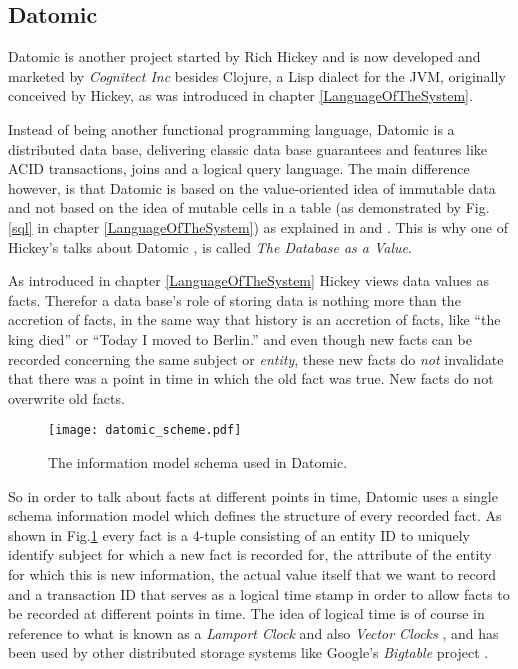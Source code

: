 \subsection{Datomic}
\label{datomic}

Datomic \cite{datomic} is another project started by Rich Hickey and is now
developed and marketed by \textit{Cognitect Inc} besides Clojure, a Lisp
dialect for the JVM, originally conceived by Hickey, as was introduced in
chapter \ref{LanguageOfTheSystem}.

Instead of being another functional programming language, Datomic
is a distributed data base, delivering classic data base guarantees and
features like ACID transactions, joins and a logical query language.
The main difference however, is that Datomic is based on the
value-oriented idea of immutable data and not based on the idea of
mutable cells in a table (as demonstrated by Fig.\ref{sql} in
chapter \ref{LanguageOfTheSystem}) as explained in
\cite{datomic-architecture} and \cite{datomic-datamodel}.
This is why one of Hickey's talks about Datomic \cite{datomic-talk1},
\cite{datomic-talk2} is called \textit{The Database as a Value}.

As introduced in chapter \ref{LanguageOfTheSystem} Hickey views
data values as facts. Therefor a data base's role of storing data
is nothing more than the accretion of facts, in the same way
that history is an accretion of facts, like ``the king died'' or
``Today I moved to Berlin.'' and even though new facts can be
recorded concerning the same subject or \textit{entity}, these
new facts do \textit{not} invalidate that there was a point in time
in which the old fact was true. New facts do not overwrite old facts.

\begin{figure}[h]
  \texttt{[image: datomic\_scheme.pdf]}
  \caption{The information model schema used in Datomic.}
  \label{datomic_schema}
\end{figure}

So in order to talk about facts at different points in time, Datomic
uses a single schema information model which defines the structure
of every recorded fact. As shown in Fig.\ref{datomic_schema} every
fact is a 4-tuple consisting of an entity ID to uniquely identify
subject for which a new fact is recorded for, the attribute of
the entity for which this is new information, the actual value itself
that we want to record and a transaction ID that serves as a logical
time stamp in order to allow facts to be recorded at different points
in time. The idea of logical time is of course in reference to what is
known as a \textit{Lamport Clock} \cite{lamportclock} and also
\textit{Vector Clocks} \cite{vectorclock1}, \cite{vectorclock2}
and has been used by other distributed storage systems like
Google's \textit{Bigtable} project \cite{bigtable}.

